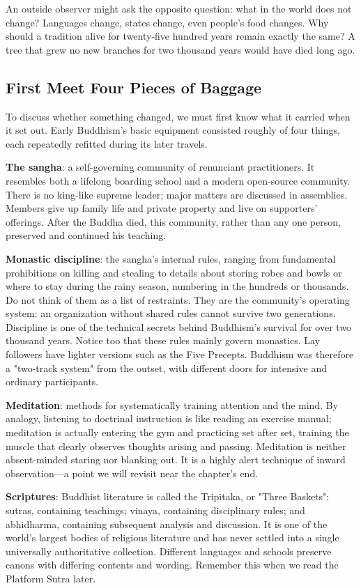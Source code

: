 An outside observer might ask the opposite question: what in the world does not change? Languages change, states change, even people's food changes. Why should a tradition alive for twenty-five hundred years remain exactly the same? A tree that grew no new branches for two thousand years would have died long ago.

\subsection{First Meet Four Pieces of Baggage}
To discuss whether something changed, we must first know what it carried when it set out. Early Buddhism's basic equipment consisted roughly of four things, each repeatedly refitted during its later travels.

\textbf{The sangha}: a self-governing community of renunciant practitioners. It resembles both a lifelong boarding school and a modern open-source community. There is no king-like supreme leader; major matters are discussed in assemblies. Members give up family life and private property and live on supporters' offerings. After the Buddha died, this community, rather than any one person, preserved and continued his teaching.

\textbf{Monastic discipline}: the sangha's internal rules, ranging from fundamental prohibitions on killing and stealing to details about storing robes and bowls or where to stay during the rainy season, numbering in the hundreds or thousands. Do not think of them as a list of restraints. They are the community's operating system: an organization without shared rules cannot survive two generations. Discipline is one of the technical secrets behind Buddhism's survival for over two thousand years. Notice too that these rules mainly govern monastics. Lay followers have lighter versions such as the Five Precepts. Buddhism was therefore a "two-track system" from the outset, with different doors for intensive and ordinary participants.

\textbf{Meditation}: methods for systematically training attention and the mind. By analogy, listening to doctrinal instruction is like reading an exercise manual; meditation is actually entering the gym and practicing set after set, training the muscle that clearly observes thoughts arising and passing. Meditation is neither absent-minded staring nor blanking out. It is a highly alert technique of inward observation---a point we will revisit near the chapter's end.

\textbf{Scriptures}: Buddhist literature is called the Tripitaka, or "Three Baskets": sutras, containing teachings; vinaya, containing disciplinary rules; and abhidharma, containing subsequent analysis and discussion. It is one of the world's largest bodies of religious literature and has never settled into a single universally authoritative collection. Different languages and schools preserve canons with differing contents and wording. Remember this when we read the Platform Sutra later.

